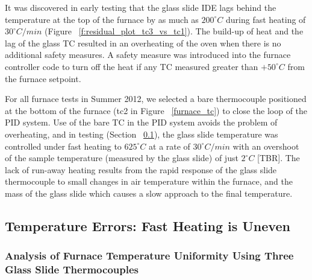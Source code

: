 	It was discovered in early testing that the glass slide IDE lags behind the temperature at the top of the furnace by as much as $200^{\circ}C$ during fast heating of $30^{\circ}C/min$ (Figure ~\ref{f:residual_plot_tc3_vs_tc1}).  
	The build-up of heat and the lag of the glass TC resulted in an overheating of the oven when there is no additional safety measures.  
	A safety measure was introduced into the furnace controller code to turn off the heat if any TC measured greater than $+50^{\circ}C$ from the furnace setpoint.

	For all furnace tests in Summer 2012, we selected a bare thermocouple positioned at the bottom of the furnace (tc2 in Figure ~\ref{furnace_tc}) to close the loop of the PID system.
	Use of the bare TC in the PID system avoids the problem of overheating, and in testing (Section ~\ref{sec:Temperature_Uniformity_Three_Slides}), the glass slide temperature was controlled under fast heating to $625^{\circ}C$ at a rate of $30^{\circ}C/min$ with an overshoot of the sample temperature (measured by the glass slide) of just $2^{\circ}C$  [TBR].  
	The lack of run-away heating results from the rapid response of the glass slide thermocouple to small changes in air temperature within the furnace, and the mass of the glass slide which causes a slow approach to the final temperature.

	
	\subsection{Temperature Errors: Fast Heating is Uneven} \label{sec:Temperature_Uniformity_Three_Slides}

	\subsubsection{Analysis of Furnace Temperature Uniformity Using Three Glass Slide Thermocouples}

